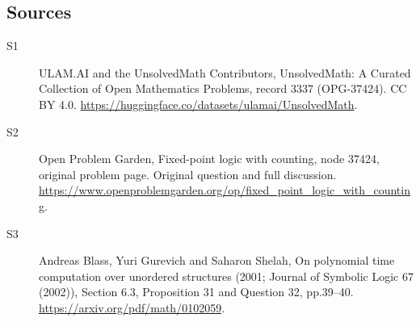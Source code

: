 \documentclass[11pt]{article}
\begin{document}
\subsection{Sources}
\begin{description}
\item[\hypertarget{source:3337:1}{S1}] ULAM.AI and the UnsolvedMath Contributors, UnsolvedMath: A Curated Collection of Open Mathematics Problems, record 3337 (OPG-37424). CC BY 4.0. \url{https://huggingface.co/datasets/ulamai/UnsolvedMath}.
\item[\hypertarget{source:3337:2}{S2}] Open Problem Garden, Fixed-point logic with counting, node 37424, original problem page. Original question and full discussion. \url{https://www.openproblemgarden.org/op/fixed_point_logic_with_counting}.
\item[\hypertarget{source:3337:3}{S3}] Andreas Blass, Yuri Gurevich and Saharon Shelah, On polynomial time computation over unordered structures (2001; Journal of Symbolic Logic 67 (2002)), Section 6.3, Proposition 31 and Question 32, pp.39–40. \url{https://arxiv.org/pdf/math/0102059}.
\end{description}
\label{end:3337}
\end{document}
